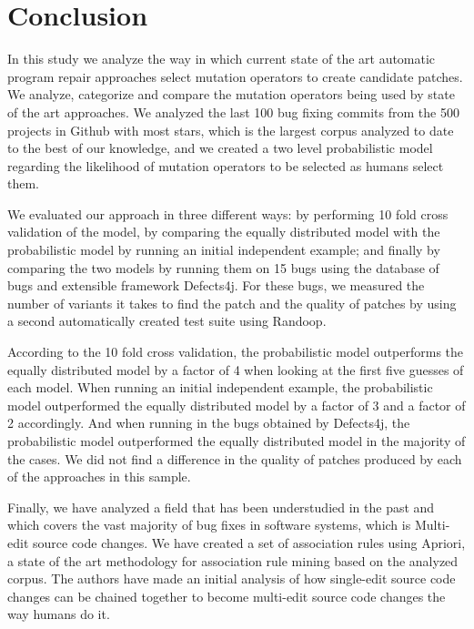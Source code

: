 \documentclass[conference]{IEEEtran}
\begin{document}
\section{Conclusion} \label{conclusion}
In this study we analyze the way in which current state of the art automatic 
program repair approaches select mutation operators to create candidate 
patches. We analyze, categorize and compare the mutation operators being used by 
state of the art approaches. We analyzed the last 100 bug fixing commits from the
500 projects in Github with most stars, which is the largest corpus analyzed to date
to the best of our knowledge, and we created a two level probabilistic model regarding 
the likelihood of mutation operators to be selected as humans select them.

We evaluated our approach in three different ways: by performing 10 fold cross 
validation of the model, by comparing the equally distributed model with the probabilistic model by running an initial independent example; and finally by  comparing the two models by running them on 15 bugs using the database of bugs and extensible 
framework Defects4j. For these bugs, we measured the number of variants it takes to find the patch and the quality of patches by using a second automatically created test suite using Randoop. 

According to the 10 fold cross validation, the probabilistic model outperforms the equally distributed model by a factor of 4 when looking at the first five guesses of each model. When running an initial independent example, the probabilistic model outperformed the equally distributed model by a factor of 3 and a factor of 2 accordingly. And when running in the bugs obtained by Defects4j, the probabilistic model outperformed the equally distributed model in the majority of the cases. We did not find a difference in the quality of patches produced by each of the approaches in this sample.

Finally, we have analyzed a field that has been understudied in the past and which covers 
the vast majority of bug fixes in software systems, which is Multi-edit source code changes. 
We have created a set of association rules using Apriori, a state of the art
methodology for association rule mining based on the analyzed corpus. The authors have
made an initial analysis of how single-edit source code changes can be chained together 
to become multi-edit source code changes the way humans do it.



\end{document}
